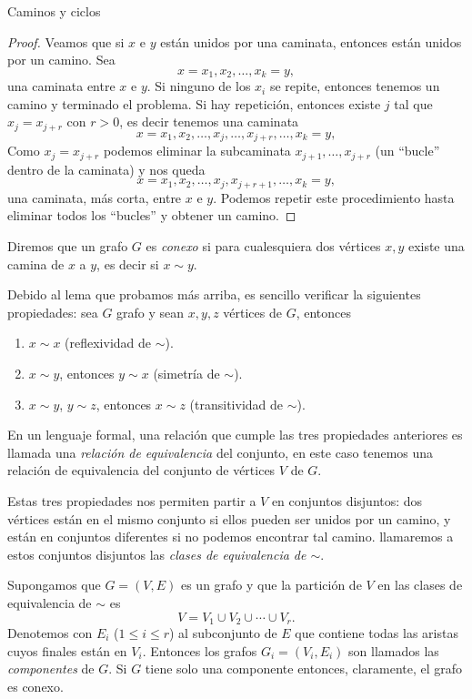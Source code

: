 \begin{section}{Caminos y ciclos}
\begin{proof}
Veamos que si  $x$ e $y$ están unidos por una caminata, entonces están unidos por un camino. Sea 
$$
x=x_1,x_2,\ldots,x_k=y,
$$
una caminata entre  $x$ e $y$. Si ninguno de los $x_i$ se repite, entonces tenemos un camino y terminado el problema. Si hay repetición, entonces existe $j$ tal que $x_j = x_{j+r}$ con $r >0$, es decir tenemos una caminata
$$
x=x_1,x_2,\ldots,x_j,\ldots,x_{j+r},\ldots, x_k=y,
$$
Como $x_j = x_{j+r}$ podemos eliminar la subcaminata $x_{j+1},\ldots,x_{j+r}$ (un ``bucle'' dentro de la caminata) y nos queda 
$$
x=x_1,x_2,\ldots,x_j,x_{j+r+1},\ldots, x_k=y,
$$
una caminata, más corta,  entre $x$ e $y$. Podemos repetir este procedimiento hasta eliminar todos los ``bucles'' y obtener un camino.
\end{proof}

\begin{definicion} Diremos que un grafo  $G$ es \textit{conexo} si para cualesquiera dos vértices $x,y$ existe una camina de $x$ a $y$, es decir si  $x \sim y$. 
\end{definicion}

Debido al lema que probamos más arriba, es sencillo verificar la siguientes propiedades: sea $G$ grafo y sean $x,y,z$ vértices de $G$, entonces
\begin{enumerate}[label=\textit{\alph*)}]
\item  $x \sim x$ (reflexividad de $\sim$).
\item  $x \sim y$, entonces $y \sim x$ (simetría de $\sim$).
\item  $x \sim y$,  $y \sim z$, entonces  $x \sim z$ (transitividad  de $\sim$).
\end{enumerate}


En un lenguaje formal, una relación que  cumple las tres propiedades anteriores es llamada una  \textit{relación de equivalencia} del conjunto, en este caso tenemos una relación de equivalencia del conjunto de vértices $V$ de $G$. 

Estas tres propiedades nos permiten partir a $V$ en conjuntos disjuntos: dos vértices están en el mismo conjunto si ellos pueden ser unidos por un camino, y están en conjuntos diferentes si no podemos encontrar tal camino. llamaremos a estos conjuntos disjuntos las \textit{clases de equivalencia de $\sim$}.

\begin{definicion}Supongamos que $G=(V,E)$ es un grafo y que la partición de $V$ en las clases de equivalencia de $\sim$ es
$$
V= V_1 \cup V_2 \cup \cdots \cup V_r.
$$
Denotemos con $E_i$ ($1\le i \le r$) al subconjunto de $E$ que contiene todas las aristas cuyos finales están en $V_i$. Entonces los grafos $G_i=(V_i,E_i)$ son llamados las \textit{componentes}     de $G$. Si $G$ tiene solo una componente entonces, claramente, el grafo es {conexo}.
\end{definicion}


\end{section}
